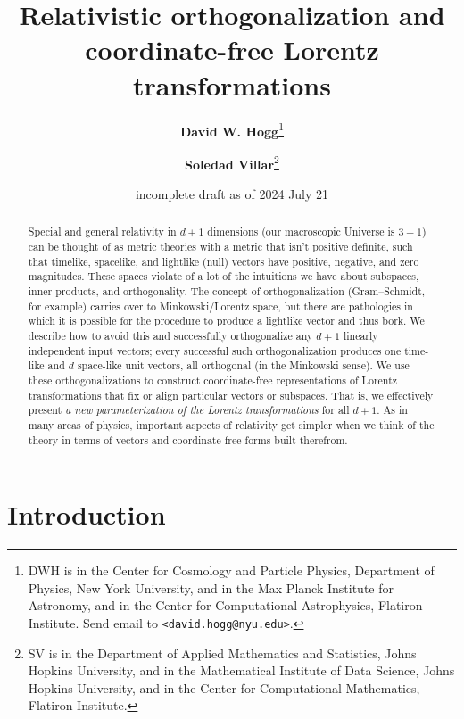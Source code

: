 \documentclass{article}
\title{\bfseries Relativistic orthogonalization and coordinate-free Lorentz transformations}
\author{\textbf{David W. Hogg}\footnote{DWH is in the Center for Cosmology and Particle Physics, Department of Physics, New York University, and in the Max Planck Institute for Astronomy, and in the Center for Computational Astrophysics, Flatiron Institute. Send email to \texttt{<david.hogg@nyu.edu>}.}
        \and
        \textbf{Soledad Villar}\footnote{SV is in the Department of Applied Mathematics and Statistics, Johns Hopkins University, and in the Mathematical Institute of Data Science, Johns Hopkins University, and in the Center for Computational Mathematics, Flatiron Institute.}}
\date{incomplete draft as of 2024 July 21}
\newcommand{\plus}{\!+\!} %
\begin{document}
\thispagestyle{plain}
\maketitle

\begin{abstract}\noindent
    Special and general relativity in $d\plus1$ dimensions (our macroscopic Universe is $3\plus1$) can be thought of as metric theories with a metric that isn't positive definite, such that timelike, spacelike, and lightlike (null) vectors have positive, negative, and zero magnitudes.
    These spaces violate of a lot of the intuitions we have about subspaces, inner products, and orthogonality.
    The concept of orthogonalization (Gram--Schmidt, for example) carries over to Minkowski/Lorentz space, but there are pathologies in which it is possible for the procedure to produce a lightlike vector and thus bork.
    We describe how to avoid this and successfully orthogonalize any $d\plus1$ linearly independent input vectors; every successful such orthogonalization produces one time-like and $d$ space-like unit vectors, all orthogonal (in the Minkowski sense).
    We use these orthogonalizations to construct coordinate-free representations of Lorentz transformations that fix or align particular vectors or subspaces.
    That is, we effectively present \emph{a new parameterization of the Lorentz transformations} for all $d\plus1$.
    As in many areas of physics, important aspects of relativity get simpler when we think of the theory in terms of vectors and coordinate-free forms built therefrom.
\end{abstract}

\section{Introduction}\label{sec:intro}
\end{document}
